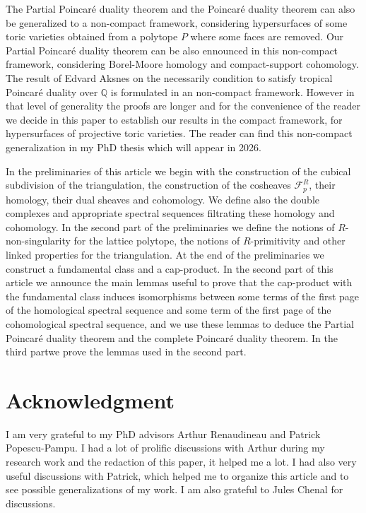 \documentclass{article}
\begin{document}
The Partial Poincaré duality theorem and the Poincaré duality theorem can also be generalized to a non-compact framework, considering hypersurfaces of some toric varieties obtained from a polytope $P$ where some faces are removed. Our Partial Poincaré duality theorem can be also ennounced in this non-compact framework, considering Borel-Moore homology and compact-support cohomology. The result of Edvard Aksnes \cite{Ak 2023} on the necessarily condition to satisfy tropical Poincaré duality over $\mathbb{Q}$ is formulated in an non-compact framework. However in that level of generality the proofs are longer and for the convenience of the reader we decide in this paper to establish our results in the compact framework, for hypersurfaces of projective toric varieties. The reader can find this non-compact generalization in my PhD thesis which will appear in 2026.

In the preliminaries of this article we begin with the construction of the cubical subdivision of the triangulation, the construction of the cosheaves $\mathcal{F}_p^R$, their homology, their dual sheaves and cohomology. We define also the double complexes and appropriate spectral sequences filtrating these homology and cohomology. In the second part of the preliminaries we define the notions of $R$-non-singularity for the lattice polytope, the notions of $R$-primitivity and other linked properties for the triangulation. At the end of the preliminaries we construct a fundamental class and a cap-product. In the second part of this article we announce the main lemmas useful to prove that the cap-product with the fundamental class induces isomorphisms between some terms of the first page of the homological spectral sequence and some term of the first page of the cohomological spectral sequence, and we use these lemmas to deduce the Partial Poincaré duality theorem and the complete Poincaré duality theorem. In the third partwe prove the lemmas used in the second part.

\section{Acknowledgment}

I am very grateful to my PhD advisors Arthur Renaudineau and Patrick Popescu-Pampu. I had a lot of prolific discussions with Arthur during my research work and the redaction of this paper, it helped me a lot. I had also very useful discussions with Patrick, which helped me to organize this article and to see possible generalizations of my work. I am also grateful to Jules Chenal for discussions.
\end{document}
